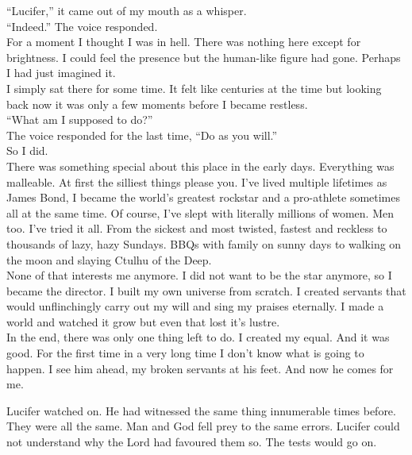 \enquote{Lucifer,} it came out of my mouth as a whisper. \\



\enquote{Indeed.} The voice responded.\\



For a moment I thought I was in hell. There was nothing here except for brightness. I could feel the presence but the human-like figure had gone. Perhaps I had just imagined it. \\



I simply sat there for some time. It felt like centuries at the time but looking back now it was only a few moments before I became restless.\\



\enquote{What am I supposed to do?}\\



The voice responded for the last time, \enquote{Do as you will.}\\



So I did.\\



There was something special about this place in the early days. Everything was malleable. At first the silliest things please you. I've lived multiple lifetimes as James Bond, I became the world's greatest rockstar and a pro-athlete sometimes all at the same time. Of course, I've slept with literally millions of women. Men too. I've tried it all. From the sickest and most twisted, fastest and reckless to thousands of lazy, hazy Sundays. BBQs with family on sunny days to walking on the moon and slaying Ctulhu of the Deep. \\



None of that interests me anymore. I did not want to be the star anymore, so I became the director. I built my own universe from scratch. I created servants that would unflinchingly carry out my will and sing my praises eternally. I made a world and watched it grow but even that lost it's lustre.\\



In the end, there was only one thing left to do. I created my equal. And it was good. For the first time in a very long time I don't know what is going to happen. I see him ahead, my broken servants at his feet. And now he comes for me.\\


\asterism


Lucifer watched on. He had witnessed the same thing innumerable times before. They were all the same. Man and God fell prey to the same errors. Lucifer could not understand why the Lord had favoured them so. The tests would go on.\\
